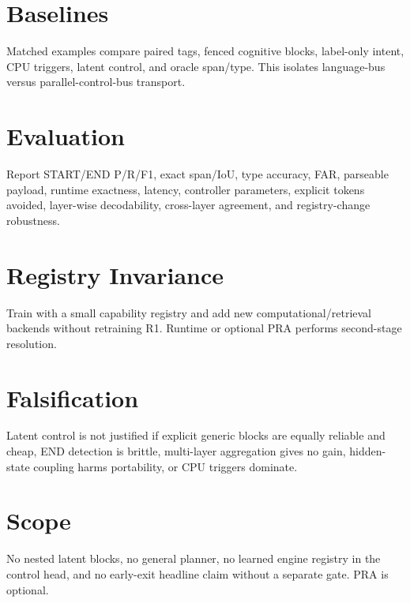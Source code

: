 \documentclass[10pt]{article}
\begin{document}
\section{Baselines}
Matched examples compare paired tags, fenced cognitive blocks, label-only intent, CPU triggers, latent control, and oracle span/type. This isolates language-bus versus parallel-control-bus transport.
\section{Evaluation}
Report START/END P/R/F1, exact span/IoU, type accuracy, FAR, parseable payload, runtime exactness, latency, controller parameters, explicit tokens avoided, layer-wise decodability, cross-layer agreement, and registry-change robustness.
\section{Registry Invariance}
Train with a small capability registry and add new computational/retrieval backends without retraining R1. Runtime or optional PRA performs second-stage resolution.
\section{Falsification}
Latent control is not justified if explicit generic blocks are equally reliable and cheap, END detection is brittle, multi-layer aggregation gives no gain, hidden-state coupling harms portability, or CPU triggers dominate.
\section{Scope}
No nested latent blocks, no general planner, no learned engine registry in the control head, and no early-exit headline claim without a separate gate. PRA is optional.
\end{document}
